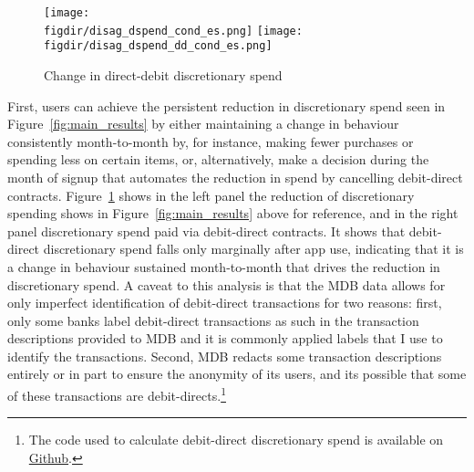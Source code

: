 \begin{figure}[h]
    \centering
    \caption{Change in direct-debit discretionary spend}%
    \label{fig:disagg_dd}
    \texttt{[image: \\figdir/disag\_dspend\_cond\_es.png]}
    \texttt{[image: \\figdir/disag\_dspend\_dd\_cond\_es.png]}
\end{figure}

First, users can achieve the persistent reduction in discretionary
spend seen in Figure~\ref{fig:main_results} by either maintaining a change in
behaviour consistently month-to-month by, for instance, making fewer purchases
or spending less on certain items, or, alternatively, make a decision during
the month of signup that automates the reduction in spend by cancelling
debit-direct contracts. Figure~\ref{fig:disagg_dd} shows in the left panel the
reduction of discretionary spending shows in Figure~\ref{fig:main_results}
above for reference, and in the right panel discretionary spend paid via
debit-direct contracts. It shows that debit-direct discretionary spend falls
only marginally after app use, indicating that it is a change in behaviour
sustained month-to-month that drives the reduction in discretionary spend. A
caveat to this analysis is that the MDB data allows for only imperfect
identification of debit-direct transactions for two reasons: first, only some
banks label debit-direct transactions as such in the transaction descriptions
provided to MDB and it is commonly applied labels that I use to identify the
transactions. Second, MDB redacts some transaction descriptions entirely or in
part to ensure the anonymity of its users, and its possible that some of these
transactions are debit-directs.\footnote{The code used to calculate
debit-direct discretionary spend is available on
\href{https://github.com/fabiangunzinger/mdb_eval/blob/f31bfcd7a330188cdd27968d41957ebf5b454099/src/data/aggregators.py\#L461}{Github}.}

